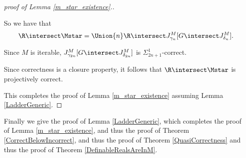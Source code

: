 \documentclass[oneside,12pt]{amsart}
\begin{document}
\begin{proof}[proof of Lemma \ref{m_star_existence}.]
\begin{subproof}
So we have that
$$\R\intersect \Mstar =  \Union{n} \R\intersect J^M_{\gamma_n}[G\intersect J^M_{\delta_n}].$$

Since $M$ is iterable, $J^M_{\gamma_{2n}}[G\intersect J^M_{\delta_{2n}}]$ is
$\Sigma^1_{2n+1}$-correct.

Since correctness is a closure property, it follows that
$\R\intersect\Mstar$ is projectively correct.
\end{subproof}


This completes the proof of Lemma \ref{m_star_existence} assuming Lemma
\ref{LadderGeneric}.

\end{proof}

Finally we give the proof of Lemma \ref{LadderGeneric}, which completes the
proof of Lemma \ref{m_star_existence}, and thus the proof of
Theorem \ref{CorrectBelowIncorrect}, and thus the proof of
Theorem \ref{QuasiCorrectness} and thus the proof of Theorem \ref{DefinableRealsAreInM}.
\end{document}

